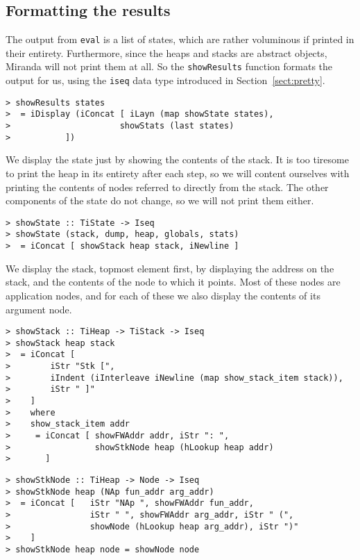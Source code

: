 \subsection{Formatting the results}

The output from \mbox{\tt eval} is a list of states, which are rather
voluminous if printed in their entirety.
Furthermore, since the heaps and stacks are abstract objects, Miranda
will not print them at all.
So the \mbox{\tt showResults} function formats the output for us, using the
\mbox{\tt iseq} data type introduced in Section~\ref{sect:pretty}.
\begin{verbatim}
> showResults states
>  = iDisplay (iConcat [ iLayn (map showState states),
>                      showStats (last states)
>           ])
\end{verbatim}
%
We display the state just by showing the contents of the stack.  It is
too tiresome to print the heap in its entirety after each step, so
we will content ourselves with printing the contents of nodes referred to
directly from the stack.  The other components of the state do not change,
so we will not print them either.
\begin{verbatim}
> showState :: TiState -> Iseq
> showState (stack, dump, heap, globals, stats)
>  = iConcat [ showStack heap stack, iNewline ]
\end{verbatim}
%
%
\par
We display the stack, topmost element first, by displaying the address on
the stack, and the contents of the node to which it points.  Most of these
nodes are application nodes, and for each of these we
also display the contents of its argument node.
\begin{verbatim}
> showStack :: TiHeap -> TiStack -> Iseq
> showStack heap stack
>  = iConcat [
>        iStr "Stk [",
>        iIndent (iInterleave iNewline (map show_stack_item stack)),
>        iStr " ]"
>    ]
>    where
>    show_stack_item addr
>     = iConcat [ showFWAddr addr, iStr ": ",
>                 showStkNode heap (hLookup heap addr)
>       ]
\end{verbatim}
%
%
\begin{verbatim}
> showStkNode :: TiHeap -> Node -> Iseq
> showStkNode heap (NAp fun_addr arg_addr)
>  = iConcat [   iStr "NAp ", showFWAddr fun_addr,
>                iStr " ", showFWAddr arg_addr, iStr " (",
>                showNode (hLookup heap arg_addr), iStr ")"
>    ]
> showStkNode heap node = showNode node
\end{verbatim}
